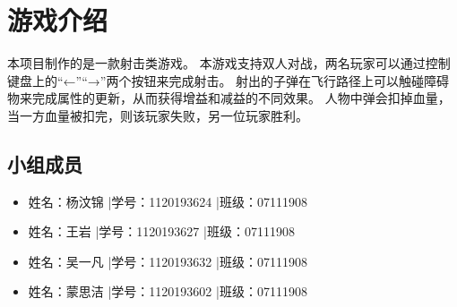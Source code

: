 %
%
%
%
%
%

\chapter{游戏介绍}
本项目制作的是一款射击类游戏。
本游戏支持双人对战，两名玩家可以通过控制键盘上的“←”“→”两个按钮来完成射击。
射出的子弹在飞行路径上可以触碰障碍物来完成属性的更新，从而获得增益和减益的不同效果。
人物中弹会扣掉血量，当一方血量被扣完，则该玩家失败，另一位玩家胜利。
\section{小组成员}
\begin{itemize}
  \item 姓名：杨汶锦 |学号：1120193624 |班级：07111908
  \item 姓名：王岩 |学号：1120193627 |班级：07111908
  \item 姓名：吴一凡 |学号：1120193632 |班级：07111908
  \item 姓名：蒙思洁 |学号：1120193602 |班级：07111908
\end{itemize}